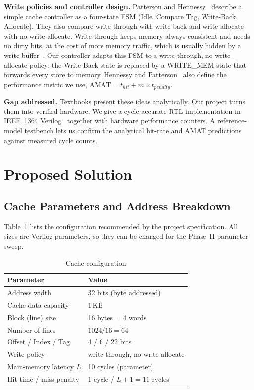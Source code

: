 \documentclass[conference]{IEEEtran}
\begin{document}
\textbf{Write policies and controller design.} Patterson and Hennessy~\cite{hp_coa} describe a simple cache controller as a four-state FSM (Idle, Compare Tag, Write-Back, Allocate). They also compare write-through with write-back and write-allocate with no-write-allocate. Write-through keeps memory always consistent and needs no dirty bits, at the cost of more memory traffic, which is usually hidden by a write buffer~\cite{hp_caqa}. Our controller adapts this FSM to a write-through, no-write-allocate policy: the Write-Back state is replaced by a WRITE\_MEM state that forwards every store to memory. Hennessy and Patterson~\cite{hp_caqa} also define the performance metric we use, $\mathrm{AMAT} = t_{hit} + m \times t_{penalty}$.

\textbf{Gap addressed.} Textbooks present these ideas analytically. Our project turns them into verified hardware. We give a cycle-accurate RTL implementation in IEEE~1364 Verilog~\cite{verilog2005} together with hardware performance counters. A reference-model testbench lets us confirm the analytical hit-rate and AMAT predictions against measured cycle counts.

\section{Proposed Solution}
\subsection{Cache Parameters and Address Breakdown}
Table~\ref{tab:params} lists the configuration recommended by the project specification. All sizes are Verilog parameters, so they can be changed for the Phase~II parameter sweep.

\begin{table}[h]
\centering
\caption{Cache configuration}
\label{tab:params}
\begin{tabular}{@{}ll@{}}
\toprule
Parameter & Value \\ \midrule
Address width & 32 bits (byte addressed) \\
Cache data capacity & 1\,KB \\
Block (line) size & 16 bytes = 4 words \\
Number of lines & $1024/16 = 64$ \\
Offset / Index / Tag & 4 / 6 / 22 bits \\
Write policy & write-through, no-write-allocate \\
Main-memory latency $L$ & 10 cycles (parameter) \\
Hit time / miss penalty & 1 cycle / $L+1 = 11$ cycles \\ \bottomrule
\end{tabular}
\end{table}
\end{document}
